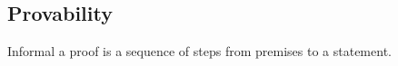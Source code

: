 \subsection{Provability}

Informal a proof is a sequence of steps from premises to a statement.




